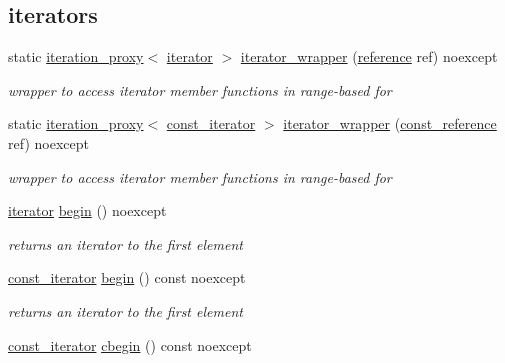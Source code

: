 \subsection*{iterators}
\begin{DoxyCompactItemize}
\item 
static \hyperlink{classnlohmann_1_1detail_1_1iteration__proxy}{iteration\+\_\+proxy}$<$ \hyperlink{classnlohmann_1_1basic__json_aa549b2b382916b3baafb526e5cb410bd}{iterator} $>$ \hyperlink{classnlohmann_1_1basic__json_a22e2e5b0e68d9d7c63be2cada5187259}{iterator\+\_\+wrapper} (\hyperlink{classnlohmann_1_1basic__json_a220ae98554a76205fb7f8822d36b2d5a}{reference} ref) noexcept
\begin{DoxyCompactList}\small\item\em wrapper to access iterator member functions in range-\/based for \end{DoxyCompactList}\item 
static \hyperlink{classnlohmann_1_1detail_1_1iteration__proxy}{iteration\+\_\+proxy}$<$ \hyperlink{classnlohmann_1_1basic__json_aebd2cfa7e4ded4e97cde9269bfeeea38}{const\+\_\+iterator} $>$ \hyperlink{classnlohmann_1_1basic__json_a3710ff8c5a1cbedb4f75b700a8962d5c}{iterator\+\_\+wrapper} (\hyperlink{classnlohmann_1_1basic__json_ab8a1c33ee7b154fc41ca2545aa9724e6}{const\+\_\+reference} ref) noexcept
\begin{DoxyCompactList}\small\item\em wrapper to access iterator member functions in range-\/based for \end{DoxyCompactList}\item 
\hyperlink{classnlohmann_1_1basic__json_aa549b2b382916b3baafb526e5cb410bd}{iterator} \hyperlink{classnlohmann_1_1basic__json_a23b495b4c282e4afacf382f5b49af7c7}{begin} () noexcept
\begin{DoxyCompactList}\small\item\em returns an iterator to the first element \end{DoxyCompactList}\item 
\hyperlink{classnlohmann_1_1basic__json_aebd2cfa7e4ded4e97cde9269bfeeea38}{const\+\_\+iterator} \hyperlink{classnlohmann_1_1basic__json_a4f147be16fcde9f510c4aac89ab511c9}{begin} () const noexcept
\begin{DoxyCompactList}\small\item\em returns an iterator to the first element \end{DoxyCompactList}\item 
\hyperlink{classnlohmann_1_1basic__json_aebd2cfa7e4ded4e97cde9269bfeeea38}{const\+\_\+iterator} \hyperlink{classnlohmann_1_1basic__json_ae508c13e3ad6ce445bcaf24a2bc7d039}{cbegin} () const noexcept

\end{DoxyCompactItemize}
